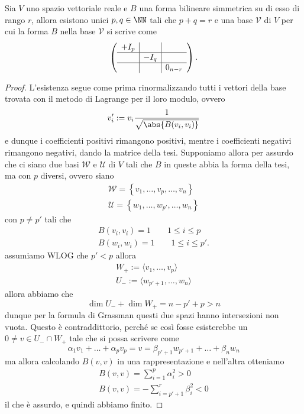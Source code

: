 \documentclass[11pt]{scrartcl}
\begin{document}
	\begin{theorem}
		Sia $V$ uno spazio vettoriale reale e $B$ una forma bilineare simmetrica su di esso di rango $r$, allora esistono unici $p,q\in\NN$ tali che $p+q=r$ e una base $\mathcal{V}$ di $V$ per cui la forma $B$ nella base $\mathcal{V}$ si scrive come
		$$
		\left(
		\begin{array}{c|c|c}
			+I_p & & \\
			\hline
			& -I_q & \\
			\hline
			& & 0_{n-r} 
		\end{array}
		\right).
		$$
	\end{theorem}
	\begin{proof}
		L'esistenza segue come prima rinormalizzando tutti i vettori della base trovata con il metodo di Lagrange per il loro modulo, ovvero
		$$v_i':=v_i\frac{1}{\sqrt{\abs{B(v_i,v_i)}}}$$
		e dunque i coefficienti positivi rimangono positivi, mentre i coefficienti negativi rimangono negativi, dando la matrice della tesi. Supponiamo allora per assurdo che ci siano due basi $\mathcal{W}$ e $\mathcal{U}$ di $V$ tali che $B$ in queste abbia la forma della tesi, ma con $p$ diversi, ovvero siano
		\begin{gather*}
			\mathcal{W}=\left\{v_1,\dots,v_p,\dots,v_n\right\} \\
			\mathcal{U}=\left\{w_1,\dots,w_{p'},\dots,w_n\right\}
		\end{gather*}
		con $p\ne p'$ tali che
		\begin{gather*}
			B(v_i,v_i)=1 \qquad 1\le i\le p \\
			B(w_i,w_i)=1 \qquad 1 \le i \le p'.
		\end{gather*}
		assumiamo WLOG che $p'<p$ allora 
		\begin{gather*}
			W_+:=\langle v_{1},\dots, v_p\rangle \\
			U_-:=\langle w_{p'+1},\dots, w_{n}\rangle 
		\end{gather*}
		allora abbiamo che
		$$\dim U_- + \dim W_+ = n-p'+p >n$$
		dunque per la formula di Grassman questi due spazi hanno intersezioni non vuota. Questo è contraddittorio, perché se così fosse esisterebbe un $0\ne v\in U_-\cap W_+$ tale che si possa scrivere come
		$$\alpha_1v_1+\dots+\alpha_pv_p=v=\beta_{p'+1}w_{p'+1}+\dots+\beta_nw_n$$
		ma allora calcolando $B(v,v)$ in una rappresentazione e nell'altra otteniamo
		\begin{gather*}
			B(v,v)=\sum_{i=1}^p \alpha_i^2 > 0 \\
			B(v,v)=-\sum_{i=p'+1}^r \beta_i^2 < 0
		\end{gather*}
		il che è assurdo, e quindi abbiamo finito.
	\end{proof}
\end{document}
